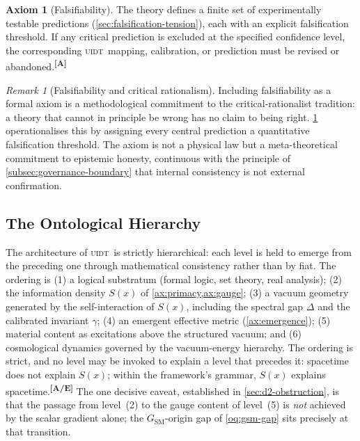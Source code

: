 \documentclass[12pt,a4paper,twoside]{article}
\theoremstyle{plain}
\theoremstyle{definition}
\newtheorem{axiom}{Axiom}
\theoremstyle{remark}
\newtheorem{remark}[theorem]{Remark}
\newcommand{\UIDT}{\textsc{uidt}}
\newcommand{\catmark}[1]{\textsuperscript{\textsf{\textbf{[#1]}}}}
\newcommand{\Sx}{S(x)}
\begin{document}
\begin{axiom}[Falsifiability]
\label{ax:falsifiability}
The theory defines a finite set of experimentally testable predictions (\cref{sec:falsification-tension}), each with an explicit falsification threshold. If any critical prediction is excluded at the specified confidence level, the corresponding \UIDT\ mapping, calibration, or prediction must be revised or abandoned.\catmark{A}
\end{axiom}

\begin{remark}[Falsifiability and critical rationalism]
\label{rem:popper}
Including falsifiability as a formal axiom is a methodological commitment to the critical-rationalist tradition: a theory that cannot in principle be wrong has no claim to being right. \cref{ax:falsifiability} operationalises this by assigning every central prediction a quantitative falsification threshold. The axiom is not a physical law but a meta-theoretical commitment to epistemic honesty, continuous with the principle of \cref{subsec:governance-boundary} that internal consistency is not external confirmation.
\end{remark}

\subsection{The Ontological Hierarchy}
\label{subsec:ontological-hierarchy}

The architecture of \UIDT\ is strictly hierarchical: each level is held to emerge from the preceding one through mathematical consistency rather than by fiat. The ordering is (1) a logical substratum (formal logic, set theory, real analysis); (2) the information density $\Sx$ of \cref{ax:primacy,ax:gauge}; (3) a vacuum geometry generated by the self-interaction of $\Sx$, including the spectral gap $\Delta$ and the calibrated invariant $\gamma$; (4) an emergent effective metric (\cref{ax:emergence}); (5) material content as excitations above the structured vacuum; and (6) cosmological dynamics governed by the vacuum-energy hierarchy. The ordering is strict, and no level may be invoked to explain a level that precedes it: spacetime does not explain $\Sx$; within the framework's grammar, $\Sx$ explains spacetime.\catmark{A/E} The one decisive caveat, established in \cref{sec:d2-obstruction}, is that the passage from level~(2) to the gauge content of level~(5) is \emph{not} achieved by the scalar gradient alone; the $G_{\mathrm{SM}}$-origin gap of \cref{oq:gsm-gap} sits precisely at that transition.
\end{document}
